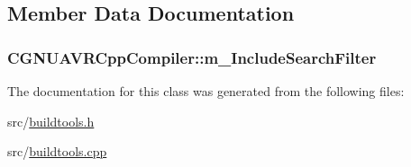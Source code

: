 \subsection{Member Data Documentation}
\hypertarget{classCGNUAVRCppCompiler_aa6e99a6249279f771b338b09697f17ec}{
\subsubsection[{m\-\_\-\-Include\-Search\-Filter}]{ C\-G\-N\-U\-A\-V\-R\-Cpp\-Compiler\-::m\-\_\-\-Include\-Search\-Filter\hspace{0.3cm}{\ttfamily [private]}}}\label{classCGNUAVRCppCompiler_aa6e99a6249279f771b338b09697f17ec}


The documentation for this class was generated from the following files\-:\begin{DoxyCompactItemize}
\item 
src/\hyperlink{buildtools_8h}{buildtools.\-h}\item 
src/\hyperlink{buildtools_8cpp}{buildtools.\-cpp}\end{DoxyCompactItemize}
